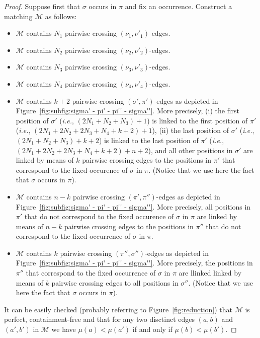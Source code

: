 \documentclass[a4paper]{llncs}
\begin{document}
\begin{proof}
  Suppose first that $\sigma$ occurs in $\pi$ and fix an occurrence.
  Construct a matching $\mathcal{M}$ as follows:
  \begin{itemize}
    \item $\mathcal{M}$ contains $N_1$ pairwise crossing
    $(\nu_1, \nu'_1)$-edges.
    \item $\mathcal{M}$ contains $N_2$ pairwise crossing
    $(\nu_2, \nu'_2)$-edges.
    \item $\mathcal{M}$ contains $N_3$ pairwise crossing
    $(\nu_3, \nu'_3)$-edges.
    \item $\mathcal{M}$ contains $N_4$ pairwise crossing
    $(\nu_4, \nu'_4)$-edges.
    \item $\mathcal{M}$ contains $k+2$ pairwise crossing
    $(\sigma', \pi')$-edges as depicted in
    Figure~\ref{fig:subfig:sigma' - pi' - pi'' - sigma''}.
    More precisely,
    (i) the first position of $\sigma'$
    (\emph{i.e.}, $(2N_1+N_2+N_3) + 1$) is linked
    to the first position of $\pi'$
    (\emph{i.e.}, $(2N_1 + 2N_2 + 2N_3 + N_4 + k + 2) + 1$),
    (ii) the last position of $\sigma'$
    (\emph{i.e.}, $(2N_1+N_2+N_3) + k+2$) is linked
    to the last position of $\pi'$
    (\emph{i.e.}, $(2N_1 + 2N_2 + 2N_3 + N_4 + k + 2) + n+2$),
    and all other positions in $\sigma'$ are linked by means of $k$ pairwise
    crossing edges to the positions in
    $\pi'$ that correspond to the fixed occurence of $\sigma$ in $\pi$.
    (Notice that we use here the fact that $\sigma$ occurs in $\pi$).
    \item $\mathcal{M}$ contains $n-k$ pairwise crossing
    $(\pi', \pi'')$-edges as depicted in
    Figure~\ref{fig:subfig:sigma' - pi' - pi'' - sigma''}.
    More precisely,
    all positions in $\pi'$ that do not correspond to the fixed occurence of
    $\sigma$ in $\pi$ are linked by means of $n-k$ pairwise crossing edges
    to the positions in $\pi''$ that do not correspond to the fixed
    occurrence of $\sigma$ in $\pi$.
    \item $\mathcal{M}$ contains $k$ pairwise crossing
    $(\pi'', \sigma'')$-edges as depicted in
    Figure~\ref{fig:subfig:sigma' - pi' - pi'' - sigma''}.
    More precisely, the positions in $\pi''$ that correspond to
    the fixed occurrence of $\sigma$ in $\pi$ are llinked
    linked by means of $k$ pairwise crossing edges to all positions in
    $\sigma''$.
    (Notice that we use here the fact that $\sigma$ occurs in $\pi$).
  \end{itemize}
  It can be easily checked (probably referring to Figure~\ref{fig:reduction}) that
  $\mathcal{M}$ is perfect, containment-free and that
  for any two disctinct edges
  $(a, b)$ and $(a', b')$ in $\mathcal{M}$
  we have $\mu(a) < \mu(a')$ if and only if $\mu(b) < \mu(b')$.



\end{proof}
\end{document}
